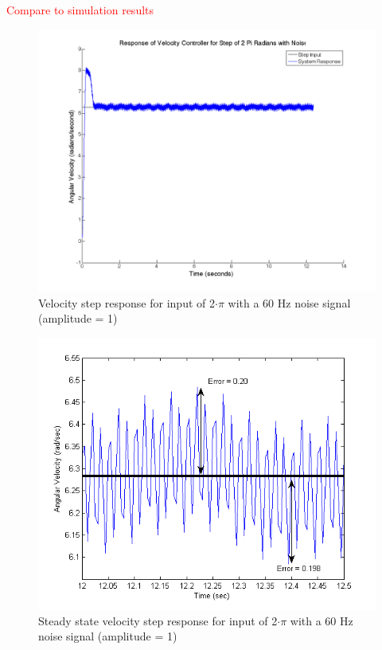 \documentclass{article}
\newcommand{\xxx}[1]{\textcolor{red}{#1}}
\theoremstyle{plain}
\theoremstyle{definition}
\theoremstyle{remark}
\begin{document}
\xxx{Compare to simulation results}

\begin{figure}[htb]
\begin{center}
\includegraphics[width = 12cm]{velstep2PiwNoise.png}
\caption{Velocity step response for input of 2$\cdot{\pi}$ with a 60 Hz noise signal (amplitude = 1)}
\label{q6_7}
\end{center}
\end{figure}

\begin{figure}[htb]
\begin{center}
\includegraphics[width = 12cm]{VelErrorNoise.png}
\caption{Steady state velocity step response for input of 2$\cdot\pi$ with a 60 Hz noise signal (amplitude = 1)}
\label{VelNoiseZoom}
\end{center}
\end{figure}
\end{document}
